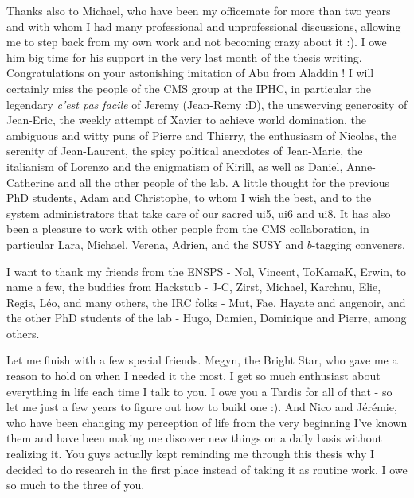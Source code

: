Thanks also to Michael, who have been my officemate for more than two years and with whom
I had many professional and unprofessional discussions, allowing me to step back from
my own work and not becoming crazy about it :). I owe him big time for his support
in the very last month of the thesis writing. Congratulations on your astonishing imitation
of Abu from Aladdin ! I will certainly miss the people of the CMS group at the IPHC, in
particular the legendary \emph{c'est pas facile} of Jeremy (Jean-Remy :D), the unswerving
generosity of Jean-Eric, the weekly attempt of Xavier to achieve world domination, the
ambiguous and witty puns of Pierre and Thierry, the enthusiasm of Nicolas, the serenity
of Jean-Laurent, the spicy political anecdotes of Jean-Marie, the italianism of Lorenzo
and the enigmatism of Kirill, as well as Daniel, Anne-Catherine and all the other people
of the lab. A little thought for the previous PhD students, Adam and Christophe,
to whom I wish the best, and to the system administrators that take care of our sacred ui5,
ui6 and ui8. It has also been a pleasure to work with other people from the CMS collaboration,
in particular Lara, Michael, Verena, Adrien, and the SUSY and $b$-tagging conveners.

I want to thank my friends from the ENSPS - Nol, Vincent, ToKamaK, Erwin, to name a few,
the buddies from Hackstub - J-C, Zirst, Michael, Karchnu, Elie, Regis, Léo, and many others,
the IRC folks - Mut, Fae, Hayate and angenoir, and the other PhD students of the lab -
Hugo, Damien, Dominique and Pierre, among others.

Let me finish with a few special friends. Megyn, the Bright Star, who gave me a reason
to hold on when I needed it the most. I get so much enthusiast about everything in life each
time I talk to you. I owe you a Tardis for all of that - so let me just a few years to figure out
how to build one :). And Nico and Jérémie, who have been changing my perception of life from
the very beginning I've known them and have been making me discover new things on a daily basis
without realizing it. You guys actually kept reminding me through this thesis why I decided
to do research in the first place instead of taking it as routine work. I owe so much to
the three of you.

\emptypage
\thispagestyle{empty}

\singlespace
\dominitoc
\renewcommand{\leftmark}{Contents}
\tableofcontents
\onehalfspacing

\emptypage

